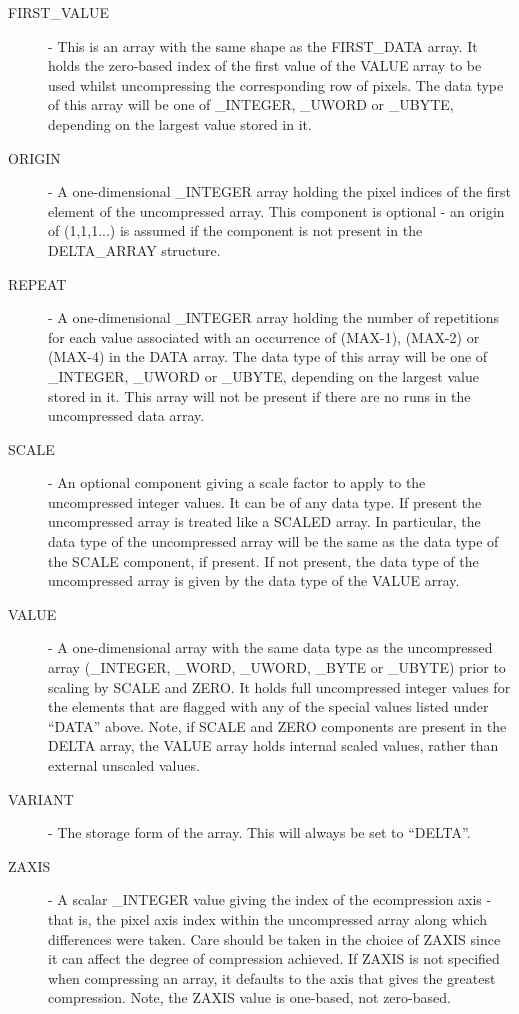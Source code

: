 \documentclass[twoside,11pt,nolof]{starlink}
\begin{document}
\begin{description}
\item[FIRST\_VALUE] - This is an array with the same shape as
the FIRST\_DATA array. It holds the zero-based index of the first value
of the VALUE array to be used whilst uncompressing the corresponding
row of pixels. The data type of this array will be one of \_INTEGER,
\_UWORD or \_UBYTE, depending on the largest value stored in it.

\item[ORIGIN] - A one-dimensional \_INTEGER array holding the pixel indices
of the first element of the uncompressed array. This component is optional
- an origin of (1,1,1...) is assumed if the component is not present in the
DELTA\_ARRAY structure.

\item[REPEAT] - A one-dimensional \_INTEGER array holding the number of
repetitions for each value associated with an occurrence of (MAX-1),
(MAX-2) or (MAX-4) in the DATA array. The data type of this array will be
one of \_INTEGER, \_UWORD or \_UBYTE, depending on the largest value stored in
it. This array will not be present if there are no runs in the uncompressed
data array.

\item[SCALE] - An optional component giving a scale factor to apply to the
uncompressed integer values. It can be of any data type. If present the
uncompressed array is treated like a SCALED array. In particular, the
data type of the uncompressed array will be the same as the data type of
the SCALE component, if present. If not present, the data type of the
uncompressed array is given by the data type of the VALUE array.

\item[VALUE] - A one-dimensional array with the same data type as the
uncompressed array (\_INTEGER, \_WORD, \_UWORD, \_BYTE or \_UBYTE) prior to
scaling by SCALE and ZERO. It holds full uncompressed integer values for
the elements that are flagged with any of the special values listed under
``DATA'' above. Note, if SCALE and ZERO components are present in the
DELTA array, the VALUE array holds internal scaled values, rather than
external unscaled values.

\item[VARIANT] - The storage form of the array. This will always be set to
``DELTA''.

\item[ZAXIS] - A scalar \_INTEGER value giving the index of the ecompression
axis - that is, the pixel axis index within the uncompressed array along
which differences were taken. Care should be taken in the choice of ZAXIS
since it can affect the degree of compression achieved. If ZAXIS is not
specified when compressing an array, it defaults to the axis that gives the
greatest compression. Note, the ZAXIS value is one-based, not zero-based.


\end{description}
\end{document}
